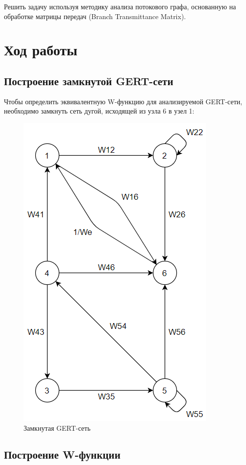 \documentclass[14pt,a4paper,report]{report}
\begin{document}
Решить задачу используя методику анализа потокового графа, основанную на обработке матрицы передач (Branch Transmittance Matrix).

\clearpage

\section{Ход работы}

\subsection{Построение замкнутой GERT-сети}

Чтобы определить эквивалентную W-функцию для анализируемой GERT-сети, необходимо замкнуть сеть дугой, исходящей из узла 6 в узел 1:

\begin{figure}[h!]
	\centering
	\includegraphics[scale = 0.55]{images/1.png}
	\caption{Замкнутая GERT-сеть}
	\label{image:1}
\end{figure}

\subsection{Построение W-функции}
\end{document}
